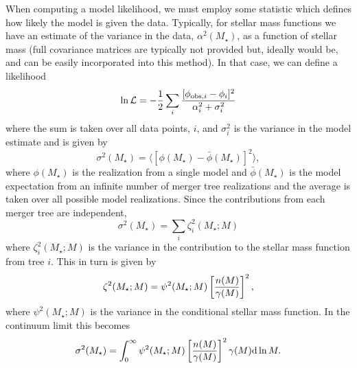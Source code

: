 When computing a model likelihood, we must employ some statistic which defines how likely the model is given the data. Typically, for stellar mass functions we have an estimate of the variance in the data, $\alpha^2(M_\star)$, as a function of stellar mass (full covariance matrices are typically not provided but, ideally would be, and can be easily incorporated into this method). In that case, we can define a likelihood
\begin{equation}
 \ln \mathcal{L} = - {1 \over 2} \sum_i {[\phi_{{\rm obs},i} - \phi_i]^2 \over \alpha_i^2 + \sigma_i^2}
\end{equation}
where the sum is taken over all data points, $i$, and $\sigma_i^2$ is the variance in the model estimate and is given by
\begin{equation}
 \sigma^2(M_\star) = \langle [\phi(M_\star) - \bar{\phi}(M_\star)]^2 \rangle,
\end{equation}
where $\phi(M_\star)$ is the realization from a single model and $\bar{\phi}(M_\star)$ is the model expectation from an infinite number of merger tree realizations and the average is taken over all possible model realizations. Since the contributions from each merger tree are independent, 
\begin{equation}
 \sigma^2(M_\star) = \sum_i \zeta_i^2(M_\star;M)
\end{equation}
where $\zeta_i^2(M_\star;M)$ is the variance in the contribution to the stellar mass function from tree $i$. This in turn is given by
\begin{equation}
 \zeta^2(M_\star;M) = \psi^2(M_\star;M) \left[{n(M) \over \gamma(M)}\right]^2,
\end{equation}
where $\psi^2(M_\star;M)$ is the variance in the conditional stellar mass function. In the continuum limit this becomes
\begin{equation}
 \sigma^2(M_\star) = \int_0^\infty \psi^2(M_\star;M) \left[{n(M) \over \gamma(M)}\right]^2 \gamma(M) \d \ln M.
\end{equation}

